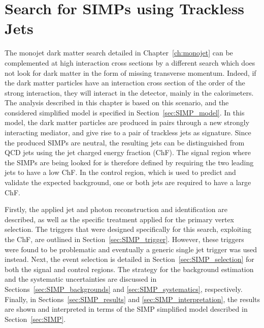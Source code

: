 \graphicspath{{chapt_dutch/}{intro/}{simps/}}

\renewcommand\evenpagerightmark{{\scshape\small Chapter 6}}
\renewcommand\oddpageleftmark{{\scshape\small Search for SIMPs using Trackless Jets}}

\renewcommand{\bibname}{References}

\hyphenation{}


\chapter{Search for SIMPs using Trackless Jets}
\label{ch:SIMPs}

The monojet dark matter search detailed in Chapter~\ref{ch:monojet} can be complemented at high interaction cross sections by a different search which does not look for dark matter in the form of missing transverse momentum. Indeed, if the dark matter particles have an interaction cross section of the order of the strong interaction, they will interact in the detector, mainly in the calorimeters. The analysis described in this chapter is based on this scenario, and the considered simplified model is specified in Section~\ref{sec:SIMP_model}. In this model, the dark matter particles are produced in pairs through a new strongly interacting mediator, and give rise to a pair of trackless jets as signature. Since the produced \acfp{SIMP} are neutral, the resulting jets can be distinguished from \ac{QCD} jets using the jet charged energy fraction (ChF). The signal region where the \acp{SIMP} are being looked for is therefore defined by requiring the two leading jets to have a low ChF. In the control region, which is used to predict and validate the expected background, one or both jets are required to have a large ChF.

Firstly, the applied jet and photon reconstruction and identification are described, as well as the specific treatment applied for the primary vertex selection. The triggers that were designed specifically for this search, exploiting the ChF, are outlined in Section~\ref{sec:SIMP_trigger}. However, these triggers were found to be problematic and eventually a generic single jet trigger was used instead. Next, the event selection is detailed in Section~\ref{sec:SIMP_selection} for both the signal and control regions. The strategy for the background estimation and the systematic uncertainties are discussed in Sections~\ref{sec:SIMP_backgrounds} and \ref{sec:SIMP_systematics}, respectively. Finally,  in Sections~\ref{sec:SIMP_results} and \ref{sec:SIMP_interpretation}, the results are shown and interpreted in terms of the \ac{SIMP} simplified model described in Section~\ref{sec:SIMP}.


